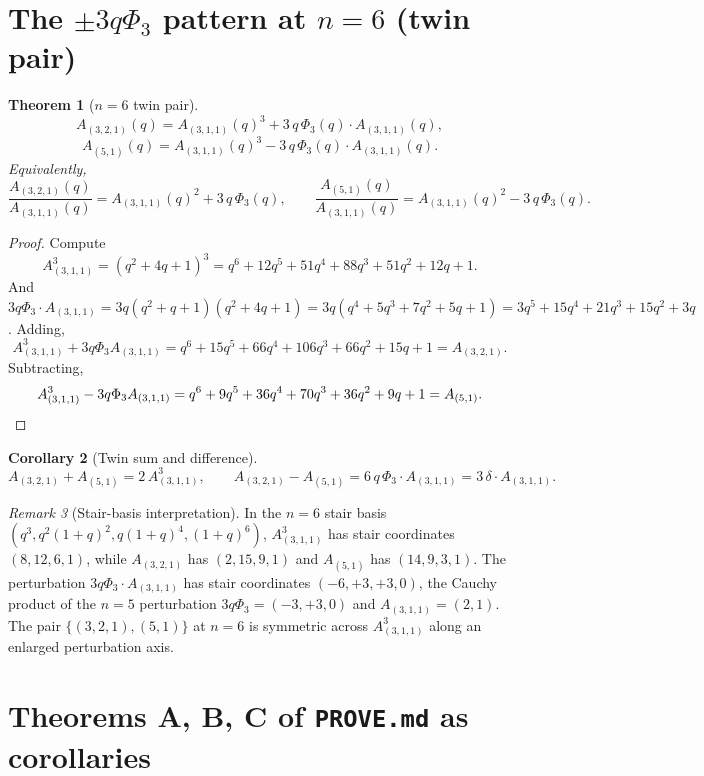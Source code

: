 \documentclass[11pt]{article}
\theoremstyle{plain}
\newtheorem{theorem}{Theorem}
\newtheorem{corollary}[theorem]{Corollary}
\theoremstyle{definition}
\theoremstyle{remark}
\newtheorem{remark}[theorem]{Remark}
\newcommand{\PhiThree}{\Phi_3}
\begin{document}
\section{The $\pm 3q\PhiThree$ pattern at $n = 6$ (twin pair)}

\begin{theorem}[$n=6$ twin pair]\label{thm:n6twin}
\[
A_{(3,2,1)}(q) = A_{(3,1,1)}(q)^3 + 3\,q\,\PhiThree(q)\cdot A_{(3,1,1)}(q),
\]
\[
A_{(5,1)}(q)   = A_{(3,1,1)}(q)^3 - 3\,q\,\PhiThree(q)\cdot A_{(3,1,1)}(q).
\]
Equivalently,
\[
\frac{A_{(3,2,1)}(q)}{A_{(3,1,1)}(q)} = A_{(3,1,1)}(q)^2 + 3\,q\,\PhiThree(q),
\qquad
\frac{A_{(5,1)}(q)}{A_{(3,1,1)}(q)} = A_{(3,1,1)}(q)^2 - 3\,q\,\PhiThree(q).
\]
\end{theorem}

\begin{proof}
Compute
\[
A_{(3,1,1)}^3 = (q^2+4q+1)^3 = q^6 + 12q^5 + 51q^4 + 88q^3 + 51q^2 + 12q + 1.
\]
And $3 q \PhiThree \cdot A_{(3,1,1)} = 3q(q^2+q+1)(q^2+4q+1) = 3 q
(q^4 + 5q^3 + 7q^2 + 5q + 1) = 3q^5 + 15q^4 + 21q^3 + 15q^2 + 3q$.
Adding,
\[
A_{(3,1,1)}^3 + 3 q \PhiThree A_{(3,1,1)}
= q^6 + 15q^5 + 66q^4 + 106q^3 + 66q^2 + 15q + 1
= A_{(3,2,1)}.
\]
Subtracting,
\[
A_{(3,1,1)}^3 - 3 q \PhiThree A_{(3,1,1)}
= q^6 + 9q^5 + 36q^4 + 70q^3 + 36q^2 + 9q + 1
= A_{(5,1)}.
\qedhere
\]
\end{proof}

\begin{corollary}[Twin sum and difference]\label{cor:twinsum}
\[
A_{(3,2,1)} + A_{(5,1)} = 2\,A_{(3,1,1)}^3,
\qquad
A_{(3,2,1)} - A_{(5,1)} = 6\,q\,\PhiThree \cdot A_{(3,1,1)} = 3\,\delta \cdot A_{(3,1,1)}.
\]
\end{corollary}

\begin{remark}[Stair-basis interpretation]
\label{rem:stairperturb6}
In the $n=6$ stair basis $(q^3, q^2(1+q)^2, q(1+q)^4, (1+q)^6)$,
$A_{(3,1,1)}^3$ has stair coordinates $(8, 12, 6, 1)$, while $A_{(3,2,1)}$ has
$(2, 15, 9, 1)$ and $A_{(5,1)}$ has $(14, 9, 3, 1)$.  The perturbation
$3q\PhiThree \cdot A_{(3,1,1)}$ has stair coordinates $(-6, +3, +3, 0)$, the
Cauchy product of the $n=5$ perturbation $3q\PhiThree = (-3, +3, 0)$ and
$A_{(3,1,1)} = (2, 1)$.  The pair $\{(3,2,1), (5,1)\}$ at $n=6$ is symmetric
across $A_{(3,1,1)}^3$ along an enlarged perturbation axis.
\end{remark}

\section{Theorems A, B, C of \texttt{PROVE.md} as corollaries}
\end{document}

